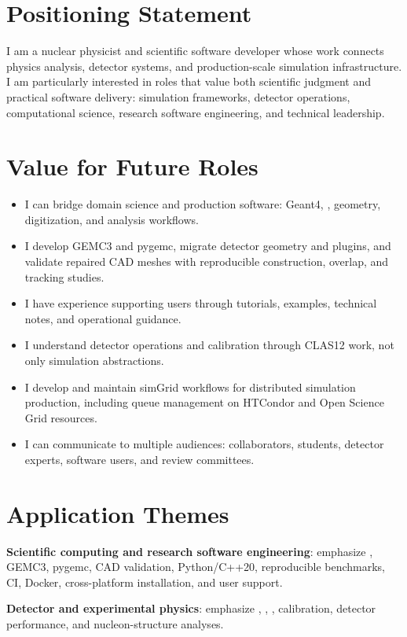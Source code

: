 \documentclass[11pt,letterpaper]{article}
\begin{document}

\section*{Positioning Statement}
I am a nuclear physicist and scientific software developer whose work connects
physics analysis, detector systems, and production-scale simulation
infrastructure. I am particularly interested in roles that value both scientific
judgment and practical software delivery: simulation frameworks, detector
operations, computational science, research software engineering, and technical
leadership.

\section*{Value for Future Roles}
\begin{itemize}
  \item I can bridge domain science and production software: Geant4, \MauriGEMC{}, \MauriClasTwelve{} geometry, digitization, and analysis workflows.
  \item I develop GEMC3 and pygemc, migrate detector geometry and plugins, and validate repaired CAD meshes
    with reproducible construction, overlap, and tracking studies.
  \item I have experience supporting users through tutorials, examples, technical notes, and operational guidance.
  \item I understand detector operations and calibration through CLAS12 \MauriLTCC{} work, not only simulation abstractions.
  \item I develop and maintain simGrid workflows for distributed simulation production, including queue
    management on HTCondor and Open Science Grid resources.
  \item I can communicate to multiple audiences: collaborators, students, detector experts, software users, and review committees.
\end{itemize}

\section*{Application Themes}
\textbf{Scientific computing and research software engineering}: emphasize \MauriGEMC{},
GEMC3, pygemc, CAD validation, Python/C++20, reproducible benchmarks, CI, Docker,
cross-platform installation, and user support.

\textbf{Detector and experimental physics}: emphasize \MauriLTCC{}, \MauriClasTwelve{}, \MauriHallB{},
calibration, detector performance, and nucleon-structure analyses.
\end{document}
